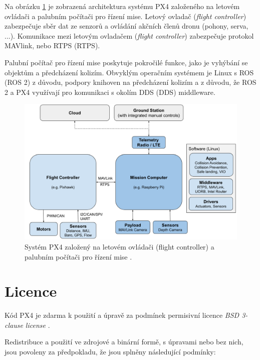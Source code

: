 Na obrázku \ref{fig:PX4_FC_PC} je zobrazená architektura systému PX4 založeného na letovém ovládači a palubním počítači pro řízení mise. Letový ovladač (\textit{flight controller}) zabezpečuje sběr dat ze senzorů a ovládání akčních členů dronu (pohony, serva, ...). Komunikace mezi letovým ovladačem (\textit{flight controller}) zabezpečuje protokol MAVlink, nebo \acs{RTPS} (\acl{RTPS}).

Palubní počítač pro řízení mise poskytuje pokročilé funkce, jako je vyhýbání se objektům a předcházení kolizím. Obvyklým operačním systémem je Linux s ROS (ROS 2) z důvodu, podpory knihoven na předcházení kolizím a z důvodu, že ROS 2 a PX4 využívají pro komunikaci s okolím \acs{DDS} (\acl{DDS}) middleware.

\begin{figure}[!ht]
    \begin{center}
        \includegraphics[scale=0.37]{obrazky/PX43}
    \end{center}
    \caption[Systém PX4 založený na letovém ovládači (flight controller) a palubním počítači pro řízení mise]{Systém PX4 založený na letovém ovládači (flight controller) a palubním počítači pro řízení mise \cite{PX4main2}.}
    \label{fig:PX4_FC_PC}
\end{figure}

\section{Licence}

Kód PX4 je zdarma k použití a úpravě za podmínek permisivní licence \textit{BSD 3-clause license} \cite{BSDlicense}.

Redistribuce a použití ve zdrojové a binární formě, s úpravami nebo bez nich, jsou povoleny za předpokladu, že jsou splněny následující podmínky:

